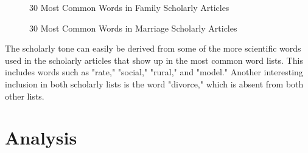 \documentclass[twocolumn]{article}
\begin{document}
\begin{figure}[h]
    \centering
    \caption{30 Most Common Words in Family Scholarly Articles}
    \label{fig:fswc}
\end{figure}

\begin{figure}[h]
    \centering
    \caption{30 Most Common Words in Marriage Scholarly Articles}
    \label{fig:mswc}
\end{figure}

The scholarly tone can easily be derived from some of the more scientific words used in the scholarly articles that show up in the most common word lists. This includes words such as "rate," "social," "rural," and "model." Another interesting inclusion in both scholarly lists is the word "divorce," which is absent from both other lists.

\section{Analysis}
\end{document}
